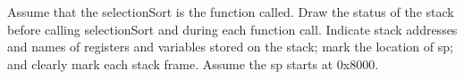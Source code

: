 \documentclass[12pt]{article}
\begin{document}
    \newpage
    \section{}
    \begin{flushleft}
        Assume that the selectionSort is the function called. Draw the status of
        the stack before calling selectionSort and during each function call. Indicate stack
        addresses and names of registers and variables stored on the stack; mark the location
        of sp; and clearly mark each stack frame. Assume the sp starts at 0x8000.
    \end{flushleft}
    \begin{lstlisting}[language=RISCV]
    \end{lstlisting}
\end{document}
